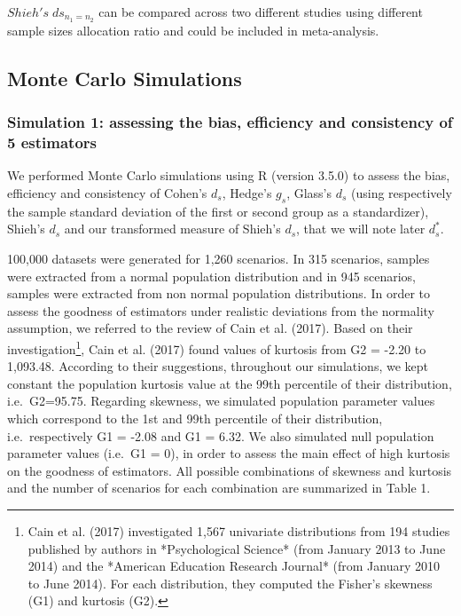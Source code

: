 \documentclass[
  man]{apa6}
\begin{document}
\(Shieh's \; ds_{n_1=n_2}\) can be compared across two different studies using different sample sizes allocation ratio and could be included in meta-analysis.

\hypertarget{monte-carlo-simulations}{%
\subsection{Monte Carlo Simulations}\label{monte-carlo-simulations}}

\hypertarget{simulation-1-assessing-the-bias-efficiency-and-consistency-of-5-estimators}{%
\subsubsection{Simulation 1: assessing the bias, efficiency and consistency of 5 estimators}\label{simulation-1-assessing-the-bias-efficiency-and-consistency-of-5-estimators}}

We performed Monte Carlo simulations using R (version 3.5.0) to assess the bias, efficiency and consistency of Cohen's \(d_s\), Hedge's \(g_s\), Glass's \(d_s\) (using respectively the sample standard deviation of the first or second group as a standardizer), Shieh's \(d_s\) and our transformed measure of Shieh's \(d_s\), that we will note later \(d_s^*\).

100,000 datasets were generated for 1,260 scenarios. In 315 scenarios, samples were extracted from a normal population distribution and in 945 scenarios, samples were extracted from non normal population distributions. In order to assess the goodness of estimators under realistic deviations from the normality assumption, we referred to the review of Cain et al. (2017). Based on their investigation\footnote{Cain et al. (2017) investigated 1,567 univariate distributions from 194 studies published by authors in *Psychological Science* (from January 2013 to June 2014) and the *American Education Research Journal* (from January 2010 to June 2014). For each distribution, they computed the Fisher's skewness (G1) and kurtosis (G2). }, Cain et al. (2017) found values of kurtosis from G2 = -2.20 to 1,093.48. According to their suggestions, throughout our simulations, we kept constant the population kurtosis value at the 99th percentile of their distribution, i.e.~G2=95.75. Regarding skewness, we simulated population parameter values which correspond to the 1st and 99th percentile of their distribution, i.e.~respectively G1 = -2.08 and G1 = 6.32. We also simulated null population parameter values (i.e.~G1 = 0), in order to assess the main effect of high kurtosis on the goodness of estimators. All possible combinations of skewness and kurtosis and the number of scenarios for each combination are summarized in Table 1.
\end{document}
